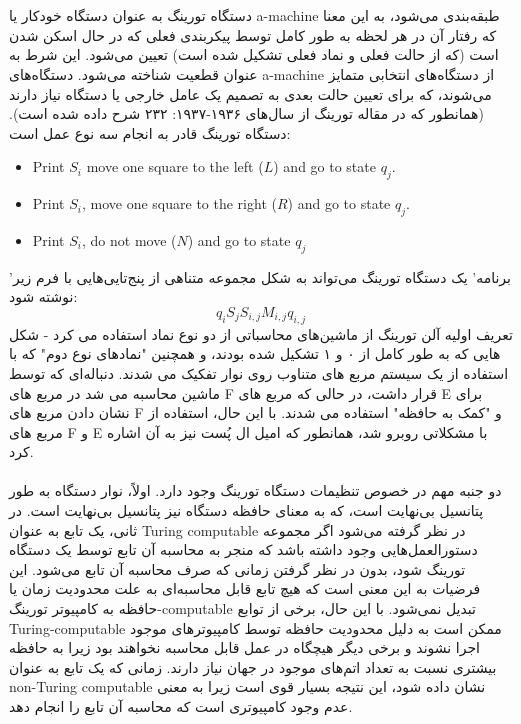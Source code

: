 \documentclass[10pt,a4paper]{article}
\begin{document}
                \\
                \\
دستگاه تورینگ به عنوان دستگاه خودکار یا a-machine طبقه‌بندی می‌شود، به این معنا که رفتار آن در هر لحظه به طور کامل توسط پیکربندی فعلی که در حال اسکن شدن است (که از حالت فعلی و نماد فعلی تشکیل شده است) تعیین می‌شود. این شرط به عنوان قطعیت شناخته می‌شود. دستگاه‌های a-machine از دستگاه‌های انتخابی متمایز می‌شوند، که برای تعیین حالت بعدی به تصمیم یک عامل خارجی یا دستگاه نیاز دارند (همانطور که در مقاله تورینگ از سال‌های ۱۹۳۶-۱۹۳۷: ۲۳۲ شرح داده شده است). دستگاه تورینگ قادر به انجام سه نوع عمل است:
                \begin{itemize}
                    \item Print $S_i$ move one square to the left ($L$) and go to state $q_j$.
                    \item Print $S_i$, move one square to the right ($R$) and go to state $q_j$.
                    \item Print $S_i$, do not move ($N$) and go to state $q_j$
                \end{itemize}
'برنامه' یک دستگاه تورینگ می‌تواند به شکل مجموعه متناهی از پنج‌تایی‌هایی با فرم زیر نوشته شود:
                \begin{equation}
                    q_i S_jS_{i,j}M_{i,j}q_{i,j}
                \end{equation}
تعریف اولیه آلن تورینگ از ماشین‌های محاسباتی از دو نوع نماد استفاده می کرد - شکل هایی که به طور کامل از ۰ و ۱ تشکیل شده بودند، و همچنین "نمادهای نوع دوم" که با استفاده از یک سیستم مربع های متناوب روی نوار تفکیک می شدند. دنباله‌ای که توسط ماشین محاسبه می شد در مربع های F قرار داشت، در حالی که مربع های E برای نشان دادن مربع های F و "کمک به حافظه" استفاده می شدند. با این حال، استفاده از مربع های F و E با مشکلاتی روبرو شد، همانطور که امیل ال پُست نیز به آن اشاره کرد.
                \\
                \\
دو جنبه مهم در خصوص تنظیمات دستگاه تورینگ وجود دارد. اولاً، نوار دستگاه به طور پتانسیل بی‌نهایت است، که به معنای حافظه دستگاه نیز پتانسیل بی‌نهایت است. در ثانی، یک تابع به عنوان Turing computable در نظر گرفته می‌شود اگر مجموعه دستورالعمل‌هایی وجود داشته باشد که منجر به محاسبه آن تابع توسط یک دستگاه تورینگ شود، بدون در نظر گرفتن زمانی که صرف محاسبه آن تابع می‌شود. این فرضیات به این معنی است که هیچ تابع قابل محاسبه‌ای به علت محدودیت زمان یا حافظه به کامپیوتر تورینگ-computable تبدیل نمی‌شود. با این حال، برخی از توابع Turing-computable ممکن است به دلیل محدودیت حافظه توسط کامپیوترهای موجود اجرا نشوند و برخی دیگر هیچگاه در عمل قابل محاسبه نخواهند بود زیرا به حافظه بیشتری نسبت به تعداد اتم‌های موجود در جهان نیاز دارند. زمانی که یک تابع به عنوان non-Turing computable نشان داده شود، این نتیجه بسیار قوی است زیرا به معنی عدم وجود کامپیوتری است که محاسبه آن تابع را انجام دهد.\cite{sep-turing-machine}
\end{document}
